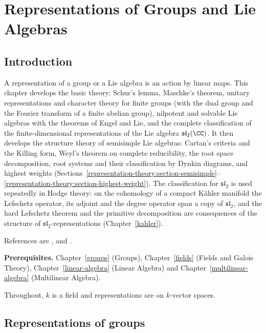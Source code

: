 \chapter{Representations of Groups and Lie Algebras}\label{representation-theory}

\section{Introduction}\label{representation-theory:section-introduction}

A representation of a group or a Lie algebra is an action by linear maps. This chapter develops the
basic theory: Schur's lemma, Maschke's theorem, unitary representations and character theory for finite groups (with the dual group and the Fourier transform of a finite abelian group), nilpotent and solvable Lie algebras with the
theorems of Engel and Lie, and the complete
classification of the finite-dimensional representations of the Lie algebra $\mathfrak{sl}_2(\CC)$. It then develops the structure theory of semisimple Lie
algebras: Cartan's criteria and the Killing form, Weyl's theorem on complete reducibility, the root space decomposition, root systems and their classification by
Dynkin diagrams, and highest weights (Sections~\ref{representation-theory:section-semisimple}--\ref{representation-theory:section-highest-weight}). The classification for
$\mathfrak{sl}_2$ is used repeatedly in Hodge theory: on the cohomology of a compact K\"ahler manifold the
Lefschetz operator, its adjoint and the degree operator span a copy of $\mathfrak{sl}_2$, and the hard
Lefschetz theorem and the primitive decomposition are consequences of the structure of
$\mathfrak{sl}_2$-representations (Chapter~\ref{kahler}).

References are \cite{serre-linear-representations}, \cite{fulton-harris} and \cite{humphreys-lie}.

\noindent\textbf{Prerequisites.} Chapter~\ref{groups} (Groups), Chapter~\ref{fields} (Fields and Galois
Theory), Chapter~\ref{linear-algebra} (Linear Algebra) and Chapter~\ref{multilinear-algebra}
(Multilinear Algebra).

Throughout, $k$ is a field and representations are on $k$-vector spaces.

\section{Representations of groups}\label{representation-theory:section-group-representations}

